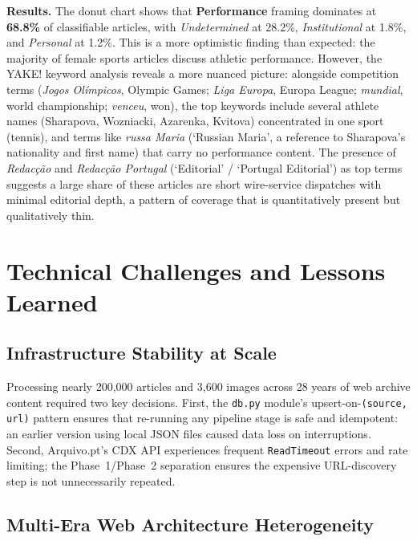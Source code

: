 \documentclass[11pt,a4paper]{article}
\begin{document}
\textbf{Results.} The donut chart shows that \textbf{Performance} framing dominates at \textbf{68.8\%} of classifiable articles, with \textit{Undetermined} at 28.2\%, \textit{Institutional} at 1.8\%, and \textit{Personal} at 1.2\%. This is a more optimistic finding than expected: the majority of female sports articles discuss athletic performance. However, the YAKE! keyword analysis reveals a more nuanced picture: alongside competition terms (\textit{Jogos Olímpicos}, Olympic Games; \textit{Liga Europa}, Europa League; \textit{mundial}, world championship; \textit{venceu}, won), the top keywords include several athlete names (Sharapova, Wozniacki, Azarenka, Kvitova) concentrated in one sport (tennis), and terms like \textit{russa Maria} (`Russian Maria', a reference to Sharapova's nationality and first name) that carry no performance content. The presence of \textit{Redacção} and \textit{Redacção Portugal} (`Editorial' / `Portugal Editorial') as top terms suggests a large share of these articles are short wire-service dispatches with minimal editorial depth, a pattern of coverage that is quantitatively present but qualitatively thin.
\section{Technical Challenges and Lessons Learned}
\label{sec:challenges}

\subsection{Infrastructure Stability at Scale}

Processing nearly 200{,}000 articles and 3{,}600 images across 28 years of web archive content required two key decisions. First, the \texttt{db.py} module's upsert-on-\texttt{(source, url)} pattern ensures that re-running any pipeline stage is safe and idempotent: an earlier version using local JSON files caused data loss on interruptions. Second, Arquivo.pt's CDX API experiences frequent \texttt{ReadTimeout} errors and rate limiting; the Phase~1/Phase~2 separation ensures the expensive URL-discovery step is not unnecessarily repeated.

\subsection{Multi-Era Web Architecture Heterogeneity}
\end{document}
